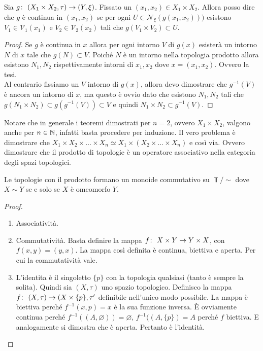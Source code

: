 \begin{theorem}
	Sia $g \colon\ (X_1 \times X_2, \tau) \rightarrow (Y, \xi)$. Fissato un $(x_1, x_2) \in X_1 \times X_2$. Allora posso dire che $g$ è continua in $(x_1, x_2)$ se per ogni $U \in \mathcal{N}_\xi(g(x_1,x_2)))$ esistono $V_1 \in \mathcal{V}_1(x_1)$ e $V_2 \in \mathcal{V}_2(x_2)$ tali che $g(V_1 \times V_2) \subset U$.
\end{theorem}
\begin{proof}
	Se $g$ è continua in $x$ allora per ogni intorno $V$ di $g(x)$ esisterà un intorno $N$ di $x$ tale che $g(N) \subset V$. Poiché $N$ è un intorno nella topologia prodotto allora esistono $N_1, N_2$ rispettivamente intorni di $x_1, x_2$ dove $x = (x_1, x_2)$. Ovvero la tesi.\\
	Al contrario fissiamo un $V$ intorno di $g(x)$, allora devo dimostrare che $g^{-1}(V)$ è ancora un intorno di $x$, ma questo è ovvio dato che esistono $N_1, N_2$ tali che $g(N_1 \times N_2) \subset g(g^{-1}(V)) \subset V$ e quindi $N_1 \times N_2 \subset g^{-1}(V)$. 
\end{proof}

Notare che in generale i teoremi dimostrati per $n=2$, ovvero $X_1 \times X_2$, valgono anche per $n \in \mathbb{N}$, infatti basta procedere per induzione. Il vero problema è dimostrare che $X_1 \times X_2 \times \dots \times X_n \simeq X_1 \times (X_2 \times \dots \times X_n)$ e così via. Ovvero dimostrare che il prodotto di topologie è un operatore associativo nella categoria degli spazi topologici. 

\begin{theorem}
	Le topologie con il prodotto formano un monoide commutativo su $\Top/\sim$ dove $X\sim Y$ se e solo se $X$ è omeomorfo $Y$.
\end{theorem}
\begin{proof}
	\begin{enumerate}
		\item Associatività. 
		\item Commutatività. Basta definire la mappa $f \colon\ X\times Y \rightarrow Y \times X$, con $f(x,y) = (y,x)$. La mappa così definita è continua, biettiva e aperta. Per cui la commutatività vale.
		\item L'identita è il singoletto $\{p\}$ con la topologia qualsiasi (tanto è sempre la solita). Quindi sia $(X, \tau)$ uno spazio topologico. Definisco la mappa $f \colon\ (X, \tau) \rightarrow (X\times \{p\}, \tau'$ definibile nell'unico modo possibile. La mappa è biettiva perché $f^{-1}(x, p) = x$ è la sua funzione inversa. È ovviamente continua perché $f^{-1}((A, \varnothing)) = \varnothing$, $f^{-1}((A, \{p\})= A$ perché $f$ biettiva. E analogamente si dimostra che è aperta. Pertanto è l'identità. 
	\end{enumerate}
\end{proof}


